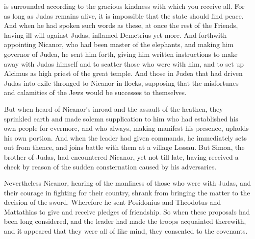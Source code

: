 { is surrounded
{} according to the gracious kindness with which you receive all.
For as long as Judas remains alive, it is impossible that the state should find peace.
And when he had spoken such words as these, at once
 the rest of the
{}
 Friends, having ill will against Judas, inflamed Demetrius yet more.
And forthwith appointing Nicanor, who had been master of the elephants, and making him governor of Judea, he sent him forth,
giving him written instructions to make away with Judas himself and to scatter those who were with him, and to set up Alcimus as high priest of the
 great temple.
And
 those in Judea that
 had
{} driven Judas into exile thronged to Nicanor in flocks, supposing that the misfortunes and calamities of the Jews would be successes to themselves.
\par }{\PP {}But when
{} heard of Nicanor’s inroad and the assault of the heathen, they sprinkled earth
{} and made solemn supplication to him who had established his own people for evermore, and who always, making manifest his presence, upholds
{} his own portion.
 And when the leader had given
{} commands, he immediately sets out from thence, and joins battle with them at a village
{} Lessau.
But Simon, the brother of Judas, had encountered Nicanor,
 yet not till late, having received a check by reason of the sudden consternation caused by his adversaries.
\par }{\PP {}Nevertheless Nicanor, hearing of the manliness of those who were with Judas, and their courage in fighting for their country, shrank from bringing the matter to the decision of the sword.
Wherefore he sent Posidonius and Theodotus and Mattathias to give and receive pledges of friendship.
So when these proposals had been long considered, and the leader had made the
 troops acquainted therewith, and it appeared that they were all of like mind, they consented to the covenants.
}
